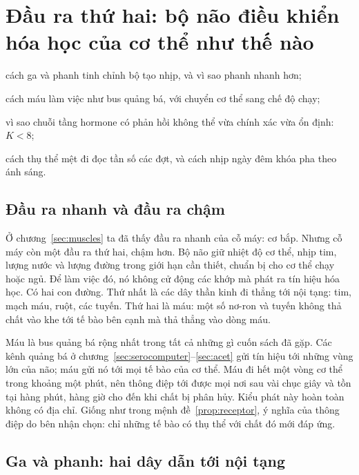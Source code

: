 \chapter{Đầu ra thứ hai: bộ não điều khiển hóa học của cơ thể như thế nào}
\label{sec:chemoutput}
\begin{chaptergoals}
\item cách ga  và phanh  tinh chỉnh bộ tạo nhịp, và vì sao phanh nhanh hơn;
\item cách máu làm việc như bus quảng bá, với  chuyển cơ thể sang chế độ chạy;
\item vì sao chuỗi tầng hormone có phản hồi không thể vừa chính xác vừa ổn định: $K<8$;
\item cách thụ thể mệt đi đọc tần số các đợt, và cách nhịp ngày đêm khóa pha theo ánh sáng.
\end{chaptergoals}

\section{Đầu ra nhanh và đầu ra chậm}

Ở chương~\ref{sec:muscles} ta đã thấy đầu ra nhanh của cỗ máy: cơ bắp. Nhưng cỗ máy còn một đầu ra thứ hai, chậm hơn. Bộ não giữ nhiệt độ cơ thể, nhịp tim, lượng nước và lượng đường trong giới hạn cần thiết, chuẩn bị cho cơ thể chạy hoặc ngủ. Để làm việc đó, nó không cử động các khớp mà phát ra tín hiệu hóa học. Có hai con đường. Thứ nhất là các dây thần kinh đi thẳng tới nội tạng: tim, mạch máu, ruột, các tuyến. Thứ hai là máu: một số nơ-ron và tuyến không thả chất vào khe tới tế bào bên cạnh mà thả thẳng vào dòng máu.

Máu là bus quảng bá rộng nhất trong tất cả những gì cuốn sách đã gặp. Các kênh quảng bá ở chương~\ref{sec:serocomputer}--\ref{sec:acet} gửi tín hiệu tới những vùng lớn của não; máu gửi nó tới mọi tế bào của cơ thể. Máu đi hết một vòng cơ thể trong khoảng một phút, nên thông điệp tới được mọi nơi sau vài chục giây và tồn tại hàng phút, hàng giờ cho đến khi chất bị phân hủy. Kiểu phát này hoàn toàn không có địa chỉ. Giống như trong mệnh đề~\ref{prop:receptor}, ý nghĩa của thông điệp do bên nhận chọn: chỉ những tế bào có thụ thể với chất đó mới đáp ứng.

\section{Ga và phanh: hai dây dẫn tới nội tạng}

